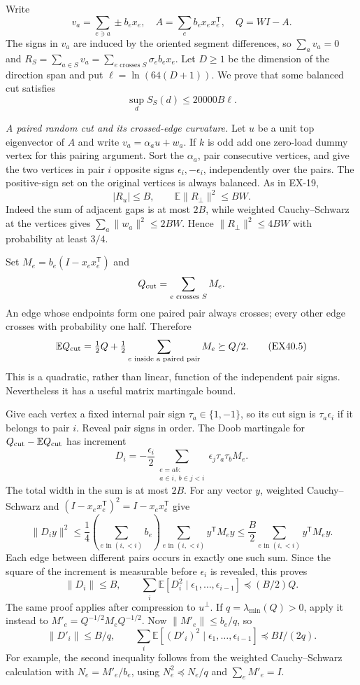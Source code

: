 Write
\[
 v_a=\sum_{e\ni a}\pm b_ex_e,\quad
 A=\sum_e b_ex_ex_e^{\mathsf T},\quad Q=WI-A.
\]
The signs in $v_a$ are induced by the oriented segment
differences, so $\sum_av_a=0$ and
$R_S=\sum_{a\in S}v_a=\sum_{e\text{ crosses }S}\sigma_eb_ex_e$.
Let $D\ge1$ be the dimension of the direction span and put
$\ell=\ln(64(D+1))$. We prove that some balanced cut satisfies
\[
                  \sup_d S_S(d)\le20000B\ell.
 \tag{EX40.3}
\]

\emph{A paired random cut and its crossed-edge curvature.}
Let $u$ be a unit top eigenvector of $A$ and write
$v_a=\alpha_au+w_a$. If $k$ is odd add one zero-load dummy
vertex for this pairing argument. Sort the $\alpha_a$,
pair consecutive vertices, and give the two vertices in pair
$i$ opposite signs $\epsilon_i,-\epsilon_i$, independently
over the pairs. The positive-sign set on the original vertices
is always balanced. As in EX-19,
\[
 |R_u|\le B,\qquad
 \mathbb E\|R_\perp\|^2\le BW.
 \tag{EX40.4}
\]
Indeed the sum of adjacent gaps is at most $2B$, while
weighted Cauchy--Schwarz at the vertices gives
$\sum_a\|w_a\|^2\le2BW$. Hence
$\|R_\perp\|^2\le4BW$ with probability at least $3/4$.

Set $M_e=b_e(I-x_ex_e^{\mathsf T})$ and
\[
 Q_{\rm cut}=\sum_{e\text{ crosses }S}M_e.
\]
An edge whose endpoints form one paired pair always crosses;
every other edge crosses with probability one half. Therefore
\[
 \mathbb E Q_{\rm cut}
 =\tfrac12 Q+\tfrac12\sum_{e\text{ inside a paired pair}}M_e
 \succeq Q/2.
 \tag{EX40.5}
\]
This is a quadratic, rather than linear, function of the
independent pair signs. Nevertheless it has a useful matrix
martingale bound.

Give each vertex a fixed internal pair sign $\tau_a\in\{1,-1\}$,
so its cut sign is $\tau_a\epsilon_i$ if it belongs to pair $i$.
Reveal pair signs in order. The Doob martingale for
$Q_{\rm cut}-\mathbb E Q_{\rm cut}$ has increment
\[
 D_i=-\frac{\epsilon_i}{2}
       \sum_{\substack{e=ab:\\a\in i,\ b\in j<i}}
          \epsilon_j\tau_a\tau_b M_e.
 \tag{EX40.6}
\]
The total width in the sum is at most $2B$. For any vector $y$,
weighted Cauchy--Schwarz and
$(I-x_ex_e^{\mathsf T})^2=I-x_ex_e^{\mathsf T}$ give
\[
 \|D_i y\|^2
 \le \frac14\left(\sum_{e\text{ in }(i,<i)}b_e\right)
             \sum_{e\text{ in }(i,<i)}y^{\mathsf T}M_ey
 \le\frac B2\sum_{e\text{ in }(i,<i)}y^{\mathsf T}M_ey.
\]
Each edge between different pairs occurs in exactly one such
sum. Since the square of the increment is measurable before
$\epsilon_i$ is revealed, this proves
\[
 \|D_i\|\le B,\qquad
 \sum_i\mathbb E[D_i^2\mid\epsilon_1,\ldots,\epsilon_{i-1}]
 \preceq (B/2)Q.
 \tag{EX40.7}
\]
The same proof applies after compression to $u^\perp$.
If $q=\lambda_{\min}(Q)>0$, apply it instead to
$M'_e=Q^{-1/2}M_eQ^{-1/2}$. Now
$\|M'_e\|\le b_e/q$, so
\[
 \|D'_i\|\le B/q,\qquad
 \sum_i\mathbb E[(D'_i)^2\mid\epsilon_1,\ldots,\epsilon_{i-1}]
 \preceq B I/(2q).
 \tag{EX40.8}
\]
For example, the second inequality follows from the weighted
Cauchy--Schwarz calculation with
$N_e=M'_e/b_e$, using $N_e^2\preceq N_e/q$ and
$\sum_eM'_e=I$.

